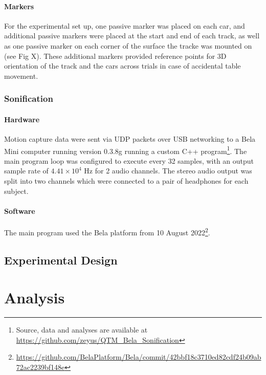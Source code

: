 \documentclass[10pt,a4paper,onecolumn]{article}
\let\oldparagraph\paragraph
\renewcommand{\paragraph}[1]{\oldparagraph{#1}\mbox{}}
\begin{document}
\hypertarget{markers}{%
\paragraph{Markers}\label{markers}}

For the experimental set up, one passive marker was placed on each car, and additional passive markers were placed at the start and end of each track, as well as one passive marker on each corner of the surface the tracke was mounted on (see Fig X).
These additional markers provided reference points for 3D orientation of the track and the cars across trials in case of accidental table movement.

\hypertarget{sonification-1}{%
\subsubsection{Sonification}\label{sonification-1}}

\hypertarget{hardware}{%
\paragraph{Hardware}\label{hardware}}

Motion capture data were sent via UDP packets over USB networking to a Bela Mini computer running version 0.3.8g running a custom C++ program\footnote{Source, data and analyses are available at \url{https://github.com/zeyus/QTM_Bela_Sonification}}. The main program loop
was configured to execute every 32 samples, with an output sample rate of \ensuremath{4.41\times 10^{4}} Hz for 2 audio channels. The stereo audio output was split into
two channels which were connected to a pair of headphones for each subject.

\hypertarget{software}{%
\paragraph{Software}\label{software}}

The main program used the Bela platform from 10 August 2022\footnote{\url{https://github.com/BelaPlatform/Bela/commit/42bbf18c3710ed82cdf24b09ab72ac2239bf148e}}.

\hypertarget{experimental-design}{%
\subsection{Experimental Design}\label{experimental-design}}

\hypertarget{analysis}{%
\section{Analysis}\label{analysis}}
\end{document}
